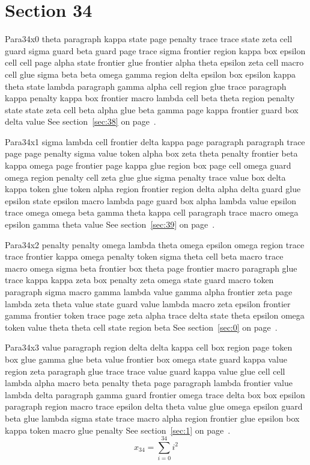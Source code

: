 \documentclass{article}
\begin{document}
\section{Section 34}\label{sec:34}
Para34x0 theta paragraph kappa state page penalty trace trace state zeta cell guard sigma guard beta guard page trace sigma frontier region kappa box epsilon cell cell page alpha state frontier glue frontier alpha theta epsilon zeta cell macro cell glue sigma beta beta omega gamma region delta epsilon box epsilon kappa theta state lambda paragraph gamma alpha cell region glue trace paragraph kappa penalty kappa box frontier macro lambda cell beta theta region penalty state state zeta cell beta alpha glue beta gamma page kappa frontier guard box delta value See section~\ref{sec:38} on page~\pageref{sec:22}.

Para34x1 sigma lambda cell frontier delta kappa page paragraph paragraph trace page page penalty sigma value token alpha box zeta theta penalty frontier beta kappa omega page frontier page kappa glue region box page cell omega guard omega region penalty cell zeta glue glue sigma penalty trace value box delta kappa token glue token alpha region frontier region delta alpha delta guard glue epsilon state epsilon macro lambda page guard box alpha lambda value epsilon trace omega omega beta gamma theta kappa cell paragraph trace macro omega epsilon gamma theta value See section~\ref{sec:39} on page~\pageref{sec:23}.

Para34x2 penalty penalty omega lambda theta omega epsilon omega region trace trace frontier kappa omega penalty token sigma theta cell beta macro trace macro omega sigma beta frontier box theta page frontier macro paragraph glue trace kappa kappa zeta box penalty zeta omega state guard macro token paragraph sigma macro gamma lambda value gamma alpha frontier zeta page lambda zeta theta value state guard value lambda macro zeta epsilon frontier gamma frontier token trace page zeta alpha trace delta state theta epsilon omega token value theta theta cell state region beta See section~\ref{sec:0} on page~\pageref{sec:24}.

Para34x3 value paragraph region delta delta kappa cell box region page token box glue gamma glue beta value frontier box omega state guard kappa value region zeta paragraph glue trace trace value guard kappa value glue cell cell lambda alpha macro beta penalty theta page paragraph lambda frontier value lambda delta paragraph gamma guard frontier omega trace delta box box epsilon paragraph region macro trace epsilon delta theta value glue omega epsilon guard beta glue lambda sigma state trace macro alpha region frontier glue epsilon box kappa token macro glue penalty See section~\ref{sec:1} on page~\pageref{sec:25}.
\begin{equation} x_{34} = \sum_{i=0}^{34} i^2 \label{eq:34}\end{equation}
\end{document}
